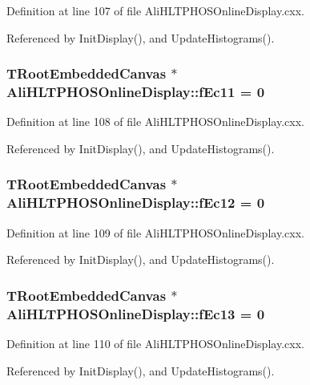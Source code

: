Definition at line 107 of file Ali\-HLTPHOSOnline\-Display.cxx.

Referenced by Init\-Display(), and Update\-Histograms().
\subsubsection{\setlength{\rightskip}{0pt plus 5cm}TRoot\-Embedded\-Canvas $\ast$ {\bf Ali\-HLTPHOSOnline\-Display::f\-Ec11} = 0\hspace{0.3cm}{\tt  [static, private]}}\label{classAliHLTPHOSOnlineDisplay_v32}




Definition at line 108 of file Ali\-HLTPHOSOnline\-Display.cxx.

Referenced by Init\-Display(), and Update\-Histograms().
\subsubsection{\setlength{\rightskip}{0pt plus 5cm}TRoot\-Embedded\-Canvas $\ast$ {\bf Ali\-HLTPHOSOnline\-Display::f\-Ec12} = 0\hspace{0.3cm}{\tt  [static, private]}}\label{classAliHLTPHOSOnlineDisplay_v33}




Definition at line 109 of file Ali\-HLTPHOSOnline\-Display.cxx.

Referenced by Init\-Display(), and Update\-Histograms().
\subsubsection{\setlength{\rightskip}{0pt plus 5cm}TRoot\-Embedded\-Canvas $\ast$ {\bf Ali\-HLTPHOSOnline\-Display::f\-Ec13} = 0\hspace{0.3cm}{\tt  [static, private]}}\label{classAliHLTPHOSOnlineDisplay_v34}




Definition at line 110 of file Ali\-HLTPHOSOnline\-Display.cxx.

Referenced by Init\-Display(), and Update\-Histograms().
